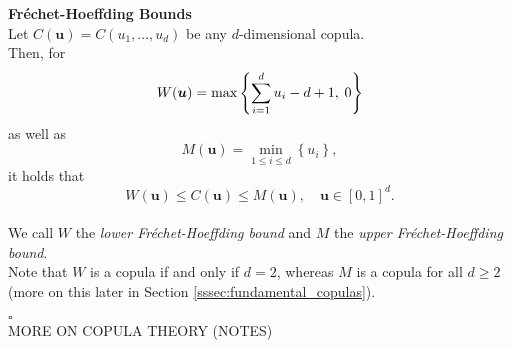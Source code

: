 \textbf{Fr\'echet-Hoeffding Bounds}\\
Let $C(\bm{u}) = C(u_1, \ldots, u_d)$ be any $d$-dimensional copula.\\
Then, for
\begin{equation}
W(\boldsymbol{u})=\max \left\{\sum\limits_{i=1}^{d} u_{i}-d+1, \hspace{0.25em} 0\right\}
\label{eq:frechet_hoeffding_lower}
\end{equation}
as well as
\begin{equation}
M(\boldsymbol{u})=\min \limits _{1 \leq i \leq d}\left\{u_{i}\right\},
\label{eq:frechet_hoeffding_upper}
\end{equation}
it holds that
\begin{equation}
W(\bm{u}) \leq C(\bm{u}) \leq M(\bm{u}), \quad \bm{u} \in[0,1]^{d}.
\label{eq:frechet_hoeffding}
\end{equation}\\
We call $W$ the \textit{lower Fr\'echet-Hoeffding bound} and $M$ the \textit{upper Fr\'echet-Hoeffding bound}.\\
Note that $W$ is a copula if and only if $d=2$, whereas $M$ is a copula for all $d \geq 2$ (more on this later in Section \ref{sssec:fundamental_copulas}).

\hfill $\square$ \\


MORE ON COPULA THEORY (NOTES)



